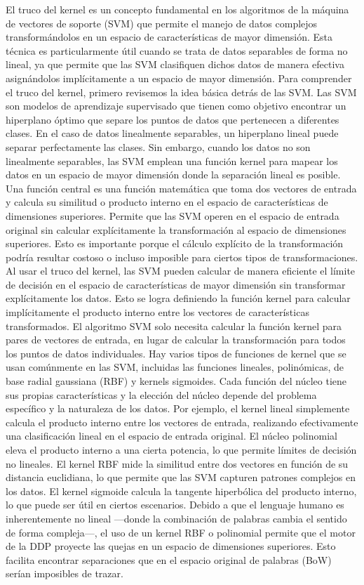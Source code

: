 El truco del kernel es un concepto fundamental en los algoritmos de la máquina de vectores de soporte (SVM) que permite el manejo de datos complejos transformándolos en un espacio de características de mayor dimensión. Esta técnica es particularmente útil cuando se trata de datos separables de forma no lineal, ya que permite que las SVM clasifiquen dichos datos de manera efectiva asignándolos implícitamente a un espacio de mayor dimensión.
Para comprender el truco del kernel, primero revisemos la idea básica detrás de las SVM. Las SVM son modelos de aprendizaje supervisado que tienen como objetivo encontrar un hiperplano óptimo que separe los puntos de datos que pertenecen a diferentes clases. En el caso de datos linealmente separables, un hiperplano lineal puede separar perfectamente las clases. Sin embargo, cuando los datos no son linealmente separables, las SVM emplean una función kernel para mapear los datos en un espacio de mayor dimensión donde la separación lineal es posible.
Una función central es una función matemática que toma dos vectores de entrada y calcula su similitud o producto interno en el espacio de características de dimensiones superiores. Permite que las SVM operen en el espacio de entrada original sin calcular explícitamente la transformación al espacio de dimensiones superiores. Esto es importante porque el cálculo explícito de la transformación podría resultar costoso o incluso imposible para ciertos tipos de transformaciones.
Al usar el truco del kernel, las SVM pueden calcular de manera eficiente el límite de decisión en el espacio de características de mayor dimensión sin transformar explícitamente los datos. Esto se logra definiendo la función kernel para calcular implícitamente el producto interno entre los vectores de características transformados. El algoritmo SVM solo necesita calcular la función kernel para pares de vectores de entrada, en lugar de calcular la transformación para todos los puntos de datos individuales.
Hay varios tipos de funciones de kernel que se usan comúnmente en las SVM, incluidas las funciones lineales, polinómicas, de base radial gaussiana (RBF) y kernels sigmoides. Cada función del núcleo tiene sus propias características y la elección del núcleo depende del problema específico y la naturaleza de los datos.
Por ejemplo, el kernel lineal simplemente calcula el producto interno entre los vectores de entrada, realizando efectivamente una clasificación lineal en el espacio de entrada original. El núcleo polinomial eleva el producto interno a una cierta potencia, lo que permite límites de decisión no lineales. El kernel RBF mide la similitud entre dos vectores en función de su distancia euclidiana, lo que permite que las SVM capturen patrones complejos en los datos. El kernel sigmoide calcula la tangente hiperbólica del producto interno, lo que puede ser útil en ciertos escenarios.
Debido a que el lenguaje humano es inherentemente no lineal —donde la combinación de palabras cambia el sentido de forma compleja—, el uso de un kernel RBF o polinomial permite que el motor de la DDP proyecte las quejas en un espacio de dimensiones superiores. Esto facilita encontrar separaciones que en el espacio original de palabras (BoW) serían imposibles de trazar.

